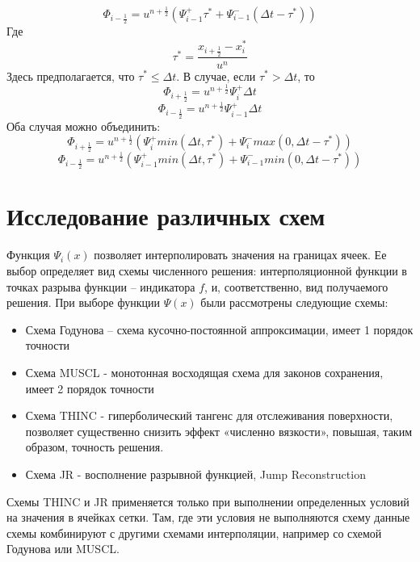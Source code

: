 \documentclass[12pt,a4paper]{article}
\begin{document}
\begin{equation}
\label{eqn:FlowLJRPsiCase1}
\Phi_{i-\frac{1}{2}}=u^{n+\frac{1}{2}}(\Psi_{i-1}^+\tau^*+\Psi_{i-1}^-(\Delta t-\tau^*))
\end{equation}
Где
\[
\tau^*=\frac{x_{i+\frac{1}{2}}-x_i^*}{u^n}
\]
Здесь предполагается, что $\tau^*\leq\Delta t$. В случае, если $\tau^*>\Delta t$, то
\begin{equation}
\label{eqn:FlowRJRPsiCase2}
\Phi_{i+\frac{1}{2}}=u^{n+\frac{1}{2}}\Psi_i^+\Delta t
\end{equation}
\begin{equation}
\label{eqn:FlowLJRPsiCase2}
\Phi_{i-\frac{1}{2}}=u^{n+\frac{1}{2}}\Psi_{i-1}^+\Delta t
\end{equation}
Оба случая можно объединить:
\begin{equation}
\label{eqn:FlowRJRPsi}
\Phi_{i+\frac{1}{2}}=u^{n+\frac{1}{2}}(\Psi_i^+min(\Delta t, \tau^*)+\Psi_i^-max(0, \Delta t-\tau^*))
\end{equation}
\begin{equation}
\label{eqn:FlowLJRPsi}
\Phi_{i-\frac{1}{2}}=u^{n+\frac{1}{2}}(\Psi_{i-1}^+min(\Delta t, \tau^*)+\Psi_{i-1}^-min(0, \Delta t-\tau^*))
\end{equation}

\section{Исследование различных схем}
Функция $\Psi_i(x)$ позволяет интерполировать значения на границах ячеек. Ее выбор определяет вид схемы численного решения: интерполяционной функции в точках разрыва функции – индикатора $f$, и, соответственно, вид получаемого решения. При выборе функции $\Psi(x)$ были рассмотрены следующие схемы:
\begin{itemize}
	\item Схема Годунова – схема кусочно-постоянной аппроксимации, имеет 1 порядок точности
	\item Схема MUSCL - монотонная восходящая схема для законов сохранения, имеет 2 порядок точности
	\item Схема THINC - гиперболический тангенс для отслеживания поверхности, позволяет существенно снизить эффект «численно вязкости», повышая, таким образом, точность решения.
	\item Схема JR - восполнение разрывной функцией, Jump Reconstruction
\end{itemize}

Схемы THINC и JR применяется только при выполнении определенных условий на значения  в ячейках сетки. Там, где эти условия не выполняются схему данные схемы комбинируют с другими схемами интерполяции, например со схемой Годунова или MUSCL.
\end{document}
